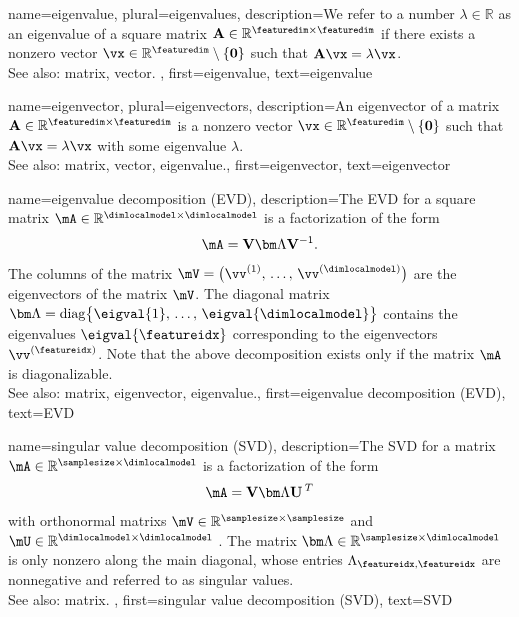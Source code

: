 {name={eigenvalue}, plural={eigenvalues}, 
	description={We refer to a 
		number $\lambda \in \mathbb{R}$ as an eigenvalue of a square \gls{matrix} $\mathbf{A} \in \mathbb{R}^{\featuredim \times \featuredim}$ 
		if there exists a nonzero \gls{vector} $\vx \in \mathbb{R}^{\featuredim} \setminus \{ \mathbf{0} \}$ such that $\mathbf{A} \vx = \lambda \vx$.
		\\
		See also: \gls{matrix}, \gls{vector}. },
	first={eigenvalue},
	text={eigenvalue} 
}
	
{name={eigenvector}, plural={eigenvectors}, 
	description={An 
		eigenvector of a \gls{matrix} $\mathbf{A} \in \mathbb{R}^{\featuredim \times \featuredim}$ 
		is a nonzero \gls{vector} $\vx \in \mathbb{R}^{\featuredim} \setminus \{ \mathbf{0} \}$ 
		such that $\mathbf{A} \vx = \lambda \vx$ with some \gls{eigenvalue} $\lambda$.
				\\
		See also: \gls{matrix}, \gls{vector}, \gls{eigenvalue}.},
	first={eigenvector},
	text={eigenvector} 
}

{name={eigenvalue decomposition (EVD)}, 
	description={The EVD
		for a square \gls{matrix} $\mA \in \mathbb{R}^{\dimlocalmodel \times \dimlocalmodel}$ 
		is a factorization of the form 
		$$\mA = \mathbf{V} {\bm \Lambda} \mathbf{V}^{-1}.$$ 
		The columns of the \gls{matrix} $\mV = \big( \vv^{(1)}, \,\ldots, \,\vv^{(\dimlocalmodel)} \big)$ are the 
		\glspl{eigenvector} of the \gls{matrix} $\mV$. The diagonal \gls{matrix} 
		${\bm \Lambda} = {\rm diag} \big\{ \eigval{1}, \,\ldots, \,\eigval{\dimlocalmodel} \big\}$ 
		contains the \glspl{eigenvalue} $\eigval{\featureidx}$ corresponding to the \glspl{eigenvector} $\vv^{(\featureidx)}$. 
		Note that the above decomposition exists only if the \gls{matrix} $\mA$ is diagonalizable.
				\\
		See also: \gls{matrix}, \gls{eigenvector}, \gls{eigenvalue}.},
	first={eigenvalue decomposition (EVD)},
	text={EVD} 
}

{name={singular value decomposition (SVD)}, 
  	description={The SVD  
  		for a \gls{matrix} $\mA \in \mathbb{R}^{\samplesize \times \dimlocalmodel}$ 
		is a factorization of the form 
		$$\mA = \mathbf{V} {\bm \Lambda} \mathbf{U}\,^{T}$$ 
		with orthonormal \glspl{matrix} $\mV \in \mathbb{R}^{\samplesize \times \samplesize}$ 
		and $\mU \in \mathbb{R}^{\dimlocalmodel \times \dimlocalmodel}$ \cite{GolubVanLoanBook}. 
		The \gls{matrix} ${\bm \Lambda} \in \mathbb{R}^{\samplesize \times \dimlocalmodel}$ is 
		only nonzero along the main diagonal, whose entries $\Lambda_{\featureidx,\featureidx}$ 
		are nonnegative and referred to as singular values.
		\\
		See also: \gls{matrix}. },
	first={singular value decomposition (SVD)},
	text={SVD} 
}


